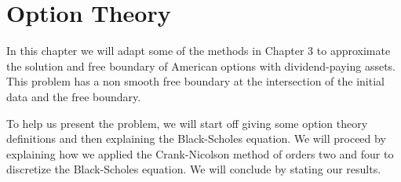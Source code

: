 \documentclass[00main.tex]{subfiles}
\begin{document}


\chapter{Option Theory}


In this chapter we will adapt some of the methods in Chapter 3 to approximate the solution and free boundary of American options with dividend-paying assets. %
This problem has a non smooth free boundary at the intersection of the initial data and the free boundary.

To help us present the problem, we will start off giving some option theory definitions and then explaining the Black-Scholes equation. We will proceed by explaining how we applied the Crank-Nicolson method of orders two and four to discretize the Black-Scholes equation. We will conclude by stating our results. 

%


\end{document}
